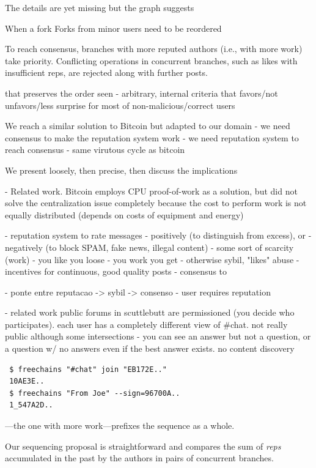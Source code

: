 \documentclass[10pt,journal,compsoc]{IEEEtran}
\newcommand{\reps} {\emph{reps}\xspace}
\begin{document}
The details are yet missing but the graph suggests

When a fork
Forks from minor users need to be reordered

To reach consensus, branches with more reputed authors
(i.e., with more work) take priority. Conflicting operations in
concurrent branches, such as likes with insufficient reps, are
rejected along with further posts.



that preserves the order seen
- arbitrary, internal criteria that favors/not unfavors/less surprise for most
  of non-malicious/correct users

We reach a similar solution to Bitcoin but adapted to our domain
- we need consensus to make the reputation system work
- we need reputation system to reach consensus
- same virutous cycle as bitcoin

We present loosely, then precise, then discuss the implications


- Related work.
Bitcoin employs CPU proof-of-work as a solution, but did not solve the
centralization issue completely because the cost to perform work is not
equally distributed
(depends on costs of equipment and energy)


- reputation system to rate messages
    - positively (to distinguish from excess), or
    - negatively (to block SPAM, fake news, illegal content)
- some sort of scarcity (work)
    - you like you loose
    - you work you get
    - otherwise sybil, "likes" abuse
    - incentives for continuous, good quality posts
- consensus to 


- ponte entre reputacao -> sybil -> consenso
- user requires reputation

- related work public forums in scuttlebutt are permissioned (you decide who
  participates). each user has a completely different view of \#chat. not really
  public although some intersections
    - you can see an answer but not a question, or a question w/ no answers
      even if the best answer exists. no content discovery


{\footnotesize
\begin{verbatim}
 $ freechains "#chat" join "EB172E.."
 10AE3E..
 $ freechains "From Joe" --sign=96700A..
 1_547A2D..
\end{verbatim}
}

---the one with more work---prefixes the
sequence as a whole.

Our sequencing proposal is straightforward and compares the sum of \reps
accumulated in the past by the authors in pairs of concurrent branches.
\end{document}
